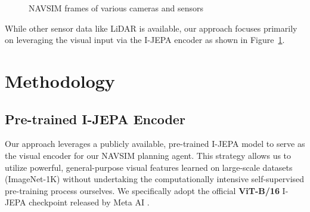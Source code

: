 \documentclass{article}
\begin{document}
\begin{figure}[ht]
    \centering
    \caption{NAVSIM frames of various cameras and sensors}
    \label{fig:navsim_scenario}
\end{figure}

While other sensor data like LiDAR is available, our approach focuses primarily on leveraging the visual input via the I-JEPA encoder as shown in Figure~\ref{fig:navsim_scenario}. 


\section{Methodology}

\subsection{Pre-trained I-JEPA Encoder}
\label{subsec:encoder}
Our approach leverages a publicly available, pre-trained I-JEPA model to serve as the visual encoder for our NAVSIM planning agent. This strategy allows us to utilize powerful, general-purpose visual features learned on large-scale datasets (ImageNet-1K) without undertaking the computationally intensive self-supervised pre-training process ourselves. We specifically adopt the official \textbf{ViT-B/16} I-JEPA checkpoint released by Meta AI \cite{assran2023ijepa}.
\end{document}
